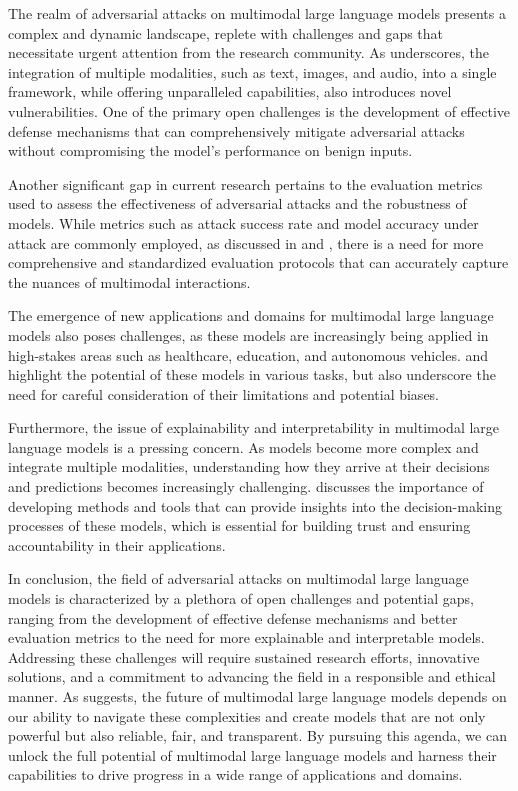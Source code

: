 \documentclass[11pt,a4paper]{article}
\begin{document}
The realm of adversarial attacks on multimodal large language models presents a complex and dynamic landscape, replete with challenges and gaps that necessitate urgent attention from the research community. As \cite{doi:10.1109/bigdata59044.2023.10386743} underscores, the integration of multiple modalities, such as text, images, and audio, into a single framework, while offering unparalleled capabilities, also introduces novel vulnerabilities. One of the primary open challenges is the development of effective defense mechanisms that can comprehensively mitigate adversarial attacks without compromising the model's performance on benign inputs. 

Another significant gap in current research pertains to the evaluation metrics used to assess the effectiveness of adversarial attacks and the robustness of models. While metrics such as attack success rate and model accuracy under attack are commonly employed, as discussed in \cite{arxiv:2408.08632} and \cite{arxiv:2408.15769}, there is a need for more comprehensive and standardized evaluation protocols that can accurately capture the nuances of multimodal interactions.

The emergence of new applications and domains for multimodal large language models also poses challenges, as these models are increasingly being applied in high-stakes areas such as healthcare, education, and autonomous vehicles. \cite{arxiv:2401.13601} and \cite{arxiv:2404.11865} highlight the potential of these models in various tasks, but also underscore the need for careful consideration of their limitations and potential biases.

Furthermore, the issue of explainability and interpretability in multimodal large language models is a pressing concern. As models become more complex and integrate multiple modalities, understanding how they arrive at their decisions and predictions becomes increasingly challenging. \cite{arxiv:2412.02104} discusses the importance of developing methods and tools that can provide insights into the decision-making processes of these models, which is essential for building trust and ensuring accountability in their applications.

In conclusion, the field of adversarial attacks on multimodal large language models is characterized by a plethora of open challenges and potential gaps, ranging from the development of effective defense mechanisms and better evaluation metrics to the need for more explainable and interpretable models. Addressing these challenges will require sustained research efforts, innovative solutions, and a commitment to advancing the field in a responsible and ethical manner. As \cite{arxiv:2409.18991} suggests, the future of multimodal large language models depends on our ability to navigate these complexities and create models that are not only powerful but also reliable, fair, and transparent. By pursuing this agenda, we can unlock the full potential of multimodal large language models and harness their capabilities to drive progress in a wide range of applications and domains.
\end{document}
